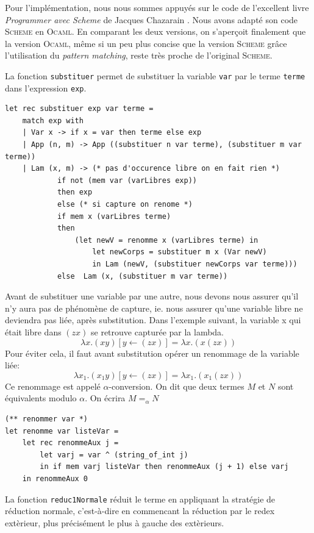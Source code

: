 \vspace{0.5cm}
Pour l'implémentation, nous nous sommes appuyés sur le code de l'excellent livre \textit{Programmer avec Scheme} 
de Jacques Chazarain \cite{plisp}.  
Nous avons adapté son code \textsc{Scheme} en \textsc{Ocaml}. En comparant les deux versions, on s'aperçoit finalement
que la version \textsc{Ocaml}, même si un peu plus concise que la version \textsc{Scheme} grâce  l'utilisation du \textit{pattern matching},
reste très proche de l'original \textsc{Scheme}.

\vspace{0.5cm}
La fonction \texttt{substituer} permet de substituer la variable \texttt{var} par le terme \texttt{terme} dans l'expression \texttt{exp}.

\begin{Verbatim}
let rec substituer exp var terme =
	match exp with
	| Var x -> if x = var then terme else exp
	| App (n, m) -> App ((substituer n var terme), (substituer m var terme))
	| Lam (x, m) -> (* pas d'occurence libre on en fait rien *)
			if not (mem var (varLibres exp))
			then exp
			else (* si capture on renome *)
			if mem x (varLibres terme)
			then
				(let newV = renomme x (varLibres terme) in
					let newCorps = substituer m x (Var newV)
					in Lam (newV, (substituer newCorps var terme)))
			else  Lam (x, (substituer m var terme))
\end{Verbatim}

Avant de substituer une variable par une autre, nous devons nous assurer qu'il n'y aura pas de phénomène de capture, ie.
nous assurer qu'une variable libre ne deviendra pas liée, après substitution.
Dans l'exemple suivant, la variable x qui était libre dans $ (z x) $ se retrouve capturée par la lambda.
$$ \lambda x. (x y)[y \gets (z x)] = \lambda x.(x (z x)) $$
Pour éviter cela, il faut avant substitution opérer un renommage de la variable liée:
$$ \lambda x_1. (x_1 y)[y \gets (z x)] = \lambda x_1.(x_1 (z x)) $$
Ce renommage est appelé $\alpha$-conversion. On dit que deux termes $M$ et $N$ sont équivalents modulo $\alpha$.
On écrira $M=_\alpha N$

\begin{Verbatim}
(** renommer var *)
let renomme var listeVar =
	let rec renommeAux j =
		let varj = var ^ (string_of_int j)
		in if mem varj listeVar then renommeAux (j + 1) else varj
	in renommeAux 0
\end{Verbatim}

La fonction \texttt{reduc1Normale}  r\'{e}duit le terme en appliquant la strat\'{e}gie de r\'{e}duction normale, c'est-\`{a}-dire
en commencant la r\'{e}duction par le redex ext\`{e}rieur, plus pr\'{e}cis\'{e}ment le plus \`{a} gauche des ext\`{e}rieurs.



